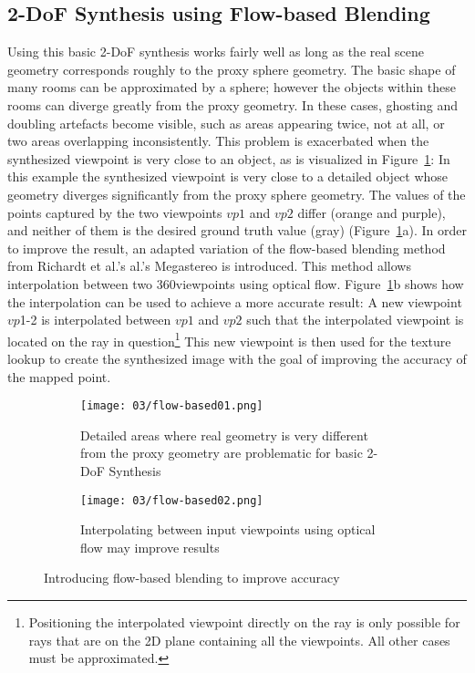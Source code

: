 \subsection{2-DoF Synthesis using Flow-based Blending}
Using this basic 2-DoF synthesis works fairly well as long as the real scene geometry corresponds roughly to the proxy sphere geometry. The basic shape of many rooms can be approximated by a sphere; however the objects within these rooms can diverge greatly from the proxy geometry. In these cases, ghosting and doubling artefacts become visible, such as areas appearing twice, not at all, or two areas overlapping inconsistently. This problem is exacerbated when the synthesized viewpoint is very close to an object, as is visualized in Figure~\ref{fig:flow-based-mot}: In this example the synthesized viewpoint is very close to a detailed object whose geometry diverges significantly from the proxy sphere geometry. The values of the points captured by the two viewpoints $vp1$ and $vp2$ differ (orange and purple), and neither of them is the desired ground truth value (gray) (Figure~\ref{fig:flow-based-mot}a). In order to improve the result, an adapted variation of the flow-based blending method from Richardt et al.'s al.'s Megastereo \cite{megastereo} is introduced. This method allows interpolation between two 360\degree viewpoints using optical flow. Figure~\ref{fig:flow-based-mot}b shows how the interpolation can be used to achieve a more accurate result: A new viewpoint $vp$1-2 is interpolated between $vp1$ and $vp2$ such that the interpolated viewpoint is located on the ray in question\footnote{Positioning the interpolated viewpoint directly on the ray is only possible for rays that are on the 2D plane containing all the viewpoints. All other cases must be approximated.} This new viewpoint is then used for the texture lookup to create the synthesized image with the goal of improving the accuracy of the mapped point.

\begin{figure}
\centering
    \hfill
    \begin{subfigure}[t]{0.4\textwidth}            
            \centering
            \texttt{[image: 03/flow-based01.png]}
            \caption{Detailed areas where real geometry is very different from the proxy geometry are problematic for basic 2-DoF Synthesis}
    \end{subfigure}%
    \hfill
    \begin{subfigure}[t]{0.4\textwidth}
            \centering
            \texttt{[image: 03/flow-based02.png]}
            \caption{Interpolating between input viewpoints using optical flow may improve results}
    \end{subfigure}
    \hfill
    \hfill
  \caption[Flow-based blending to improve accuracy in close, detailed areas]{Introducing flow-based blending to improve accuracy} \label{fig:flow-based-mot}
\end{figure}

